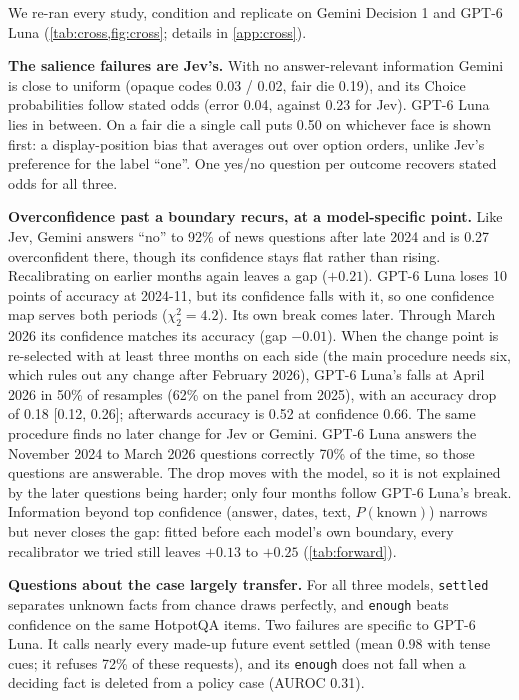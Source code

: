 \documentclass[10pt,twocolumn]{article}
\begin{document}
We re-ran every study, condition and replicate on Gemini Decision 1 and
GPT-6 Luna (\cref{tab:cross,fig:cross}; details in \cref{app:cross}).

\textbf{The salience failures are Jev's.} With no answer-relevant
information Gemini is close to uniform (opaque codes 0.03 / 0.02, fair die
0.19), and its Choice probabilities follow stated odds (error 0.04, against
0.23 for Jev). GPT-6 Luna lies in between. On a fair die a single call puts
0.50 on whichever face is shown first: a display-position bias that averages
out over option orders, unlike Jev's preference for the label ``one''. One
yes/no question per outcome recovers stated odds for all three.

\textbf{Overconfidence past a boundary recurs, at a model-specific point.}
Like Jev, Gemini answers ``no'' to 92\% of news questions after late 2024
and is 0.27 overconfident there, though its confidence stays flat rather
than rising. Recalibrating on earlier months again leaves a gap ($+0.21$).
GPT-6 Luna loses 10 points of accuracy at 2024-11, but its confidence falls
with it, so one confidence map serves both periods ($\chi^2_2=4.2$). Its own
break comes later. Through March 2026 its confidence matches its accuracy
(gap $-0.01$). When the change point is re-selected with at least three
months on each side (the main procedure needs six, which rules out any
change after February 2026), GPT-6 Luna's falls at April 2026 in 50\% of
resamples (62\% on the panel from 2025), with an accuracy drop of 0.18
[0.12, 0.26]; afterwards accuracy is 0.52 at confidence 0.66. The same
procedure finds no later change for Jev or Gemini. GPT-6 Luna answers the
November 2024 to March 2026 questions correctly 70\% of the time, so those
questions are answerable. The drop moves with the model, so it is not
explained by the later questions being harder; only four months follow
GPT-6 Luna's break. Information beyond top confidence (answer, dates, text,
$P(\text{known})$) narrows but never closes the gap: fitted before each
model's own boundary, every recalibrator we tried still leaves $+0.13$ to
$+0.25$ (\cref{tab:forward}).

\textbf{Questions about the case largely transfer.} For all three models,
\texttt{settled} separates unknown facts from chance draws perfectly, and
\texttt{enough} beats confidence on the same HotpotQA items. Two failures
are specific to GPT-6 Luna. It calls nearly every made-up future event
settled (mean 0.98 with tense cues; it refuses 72\% of these requests), and
its \texttt{enough} does not fall when a deciding fact is deleted from a
policy case (AUROC 0.31).
\end{document}
